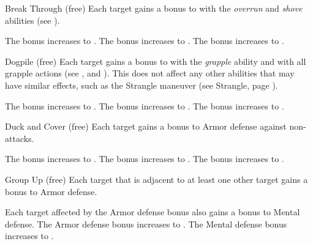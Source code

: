         {
            \begin{durationability}{Break Through}
                 (free)
                \rankline
                Each target gains a  bonus to  with the \textit{overrun} and \textit{shove} abilities (see ).

                \rankline
                 The bonus increases to .
                 The bonus increases to .
                 The bonus increases to .
            \end{durationability}

            \begin{durationability}{Dogpile}
                 (free)
                \rankline
                Each target gains a  bonus to  with the \textit{grapple} ability and with all grapple actions (see , and ).
                This does not affect any other abilities that may have similar effects, such as the Strangle maneuver (see Strangle, page ).

                \rankline
                 The bonus increases to .
                 The bonus increases to .
                 The bonus increases to .
            \end{durationability}

            \begin{durationability}{Duck and Cover}
                 (free)
                \rankline
                Each target gains a  bonus to Armor defense against non- attacks.

                \rankline
                 The bonus increases to .
                 The bonus increases to .
                 The bonus increases to .
            \end{durationability}

            \begin{durationability}{Group Up}
                 (free)
                \rankline
                Each target that is adjacent to at least one other target gains a  bonus to Armor defense.

                \rankline
                 Each target affected by the Armor defense bonus also gains a  bonus to Mental defense.
                 The Armor defense bonus increases to .
                 The Mental defense bonus increases to .
            \end{durationability}

}
